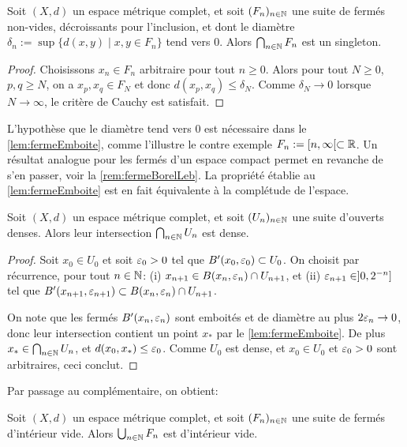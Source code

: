 \begin{lemma}
\label{lem:fermeEmboite}
%
Soit $(X,d)$ un espace métrique complet, et soit $(F_n)_{n \in \mathbb{N}}$ une suite de fermés non-vides, décroissants pour l'inclusion, et dont le diamètre $\delta_n := \sup \{d(x,y) \mid x,y \in F_n\}$ tend vers $0$. Alors $\bigcap_{n \in \mathbb{N}} F_n$ est un singleton. 
\end{lemma}

\begin{proof}
	Choisissons $x_n \in F_n$ arbitraire pour tout $n \geq 0$. Alors pour tout $N \geq 0$, $p,q\geq N$, on a $x_p,x_q \in F_N$ et donc $d(x_p,x_q) \leq \delta_N$. Comme $\delta_N\to 0$ lorsque $N \to \infty$, le critère de Cauchy est satisfait.
\end{proof}

L'hypothèse que le diamètre tend vers $0$ est nécessaire dans le \cref{lem:fermeEmboite}, comme l'illustre le contre exemple $F_n := [n,\infty[ \subset \mathbb{R}$. 
Un résultat analogue pour les fermés d'un espace compact permet en revanche de s'en passer, voir la \cref{rem:fermeBorelLeb}. La propriété établie au \cref{lem:fermeEmboite} est en fait équivalente à la complétude de l'espace.

\begin{theorem}[Baire]
\label{th:BaireOuvert}
%
Soit $(X,d)$ un espace métrique complet, et soit $(U_n)_{n \in \mathbb{N}}$ une suite d'ouverts denses. 
Alors leur intersection $\bigcap_{n \in \mathbb{N}} U_n$ est dense. 	
\end{theorem}

\begin{proof}
	Soit $x_0\in U_0$ et soit $\varepsilon_0>0$ tel que $B'(x_0,\varepsilon_0) \subset U_0$. On choisit par récurrence, pour tout $n\in \mathbb{N}$: (i) $x_{n+1} \in B(x_n,\varepsilon_n) \cap U_{n+1}$, et (ii) $\varepsilon_{n+1} \in ]0,2^{-n}]$ tel que $B'(x_{n+1},\varepsilon_{n+1}) \subset B(x_n,\varepsilon_n) \cap U_{n+1}$. 

	On note que les fermés $B'(x_n,\varepsilon_n)$ sont emboités et de diamètre au plus $2\varepsilon_n\to 0$, donc leur intersection contient un point $x_*$ par le \cref{lem:fermeEmboite}.
	De plus $x_* \in \bigcap_{n \in \mathbb{N}} U_n$, et $d(x_0,x_*) \leq \varepsilon_0$. Comme $U_0$ est dense, et  $x_0\in U_0$ et $\varepsilon_0>0$ sont arbitraires, ceci conclut. 
\end{proof}

Par passage au complémentaire, on obtient:

\begin{corollary}
\label{corol:BaireFerme}
%
	Soit $(X,d)$ un espace métrique complet, et soit $(F_n)_{n \in \mathbb{N}}$ une suite de fermés d'intérieur vide. Alors $\bigcup_{n \in \mathbb{N}} F_n$ est d'intérieur vide. 
\end{corollary}


